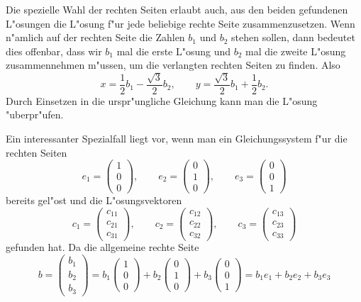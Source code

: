 Die spezielle Wahl der rechten Seiten erlaubt auch, aus den
beiden gefundenen L"osungen die L"osung f"ur jede beliebige rechte
Seite zusammenzusetzen. Wenn n"amlich auf der rechten
Seite die Zahlen $b_1$ und $b_2$ stehen sollen, dann
bedeutet dies offenbar, dass wir $b_1$ mal die erste L"osung
und $b_2$ mal die zweite L"osung zusammennehmen m"ussen, um
die verlangten rechten Seiten zu finden. Also
$$x=\frac12b_1-\frac{\sqrt{3}}2b_2,\qquad y=\frac{\sqrt{3}}2b_1+\frac12b_2.$$
Durch Einsetzen in die urspr"ungliche Gleichung kann man die
L"osung "uberpr"ufen.

Ein interessanter Spezialfall liegt vor, wenn man ein Gleichungssystem
f"ur die rechten Seiten 
\[
e_1=\begin{pmatrix}1\\0\\0\end{pmatrix},\qquad
e_2=\begin{pmatrix}0\\1\\0\end{pmatrix},\qquad
e_3=\begin{pmatrix}0\\0\\1\end{pmatrix}
\]
bereits gel"ost und die L"osungsvektoren
\[
c_1=\begin{pmatrix} c_{11}\\ c_{21}\\ c_{31} \end{pmatrix},\qquad
c_2=\begin{pmatrix} c_{12}\\ c_{22}\\ c_{32} \end{pmatrix},\qquad
c_3=\begin{pmatrix} c_{13}\\ c_{23}\\ c_{33} \end{pmatrix}
\]
gefunden hat.
Da die allgemeine rechte Seite
\[
b=\begin{pmatrix}
b_1\\b_2\\b_3
\end{pmatrix}
=
b_1 \begin{pmatrix}1\\0\\0\end{pmatrix}
+
b_2 \begin{pmatrix}0\\1\\0\end{pmatrix}
+
b_3 \begin{pmatrix}0\\0\\1\end{pmatrix}
=
b_1 e_1 + b_2 e_2 + b_3 e_3
\]
